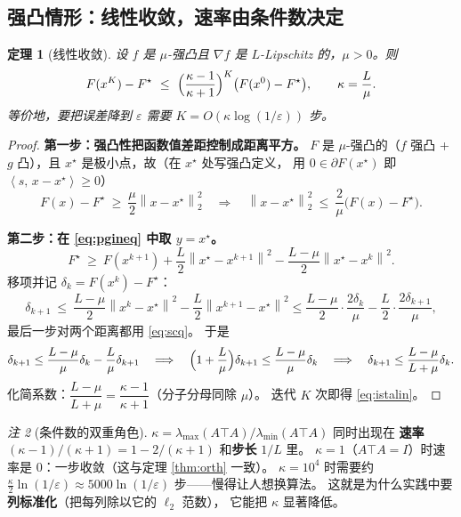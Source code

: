 \documentclass[11pt,a4paper,UTF8]{ctexart}
\theoremstyle{plain}
\newtheorem{theorem}{定理}[section]
\theoremstyle{definition}
\theoremstyle{remark}
\newtheorem{remark}[theorem]{注}
\newcommand{\norm}[1]{\left\lVert #1 \right\rVert}
\newcommand{\inner}[2]{\left\langle #1,\, #2 \right\rangle}
\newcommand{\eps}{\varepsilon}
\begin{document}
\subsection{强凸情形：线性收敛，速率由条件数决定}

\begin{theorem}[线性收敛]\label{thm:istalin}
设 $f$ 是 $\mu$-强凸且 $\nabla f$ 是 $L$-Lipschitz 的，$\mu>0$。则
\begin{equation}
F(x^K)-F^\star\ \le\ \Bigl(\frac{\kappa-1}{\kappa+1}\Bigr)^{K}\bigl(F(x^0)-F^\star\bigr),
\qquad \kappa=\frac L\mu .
\label{eq:istalin}
\end{equation}
等价地，要把误差降到 $\eps$ 需要 $K=O(\kappa\log(1/\eps))$ 步。
\end{theorem}

\begin{proof}
\textbf{第一步：强凸性把函数值差距控制成距离平方。}
$F$ 是 $\mu$-强凸的（$f$ 强凸 + $g$ 凸），且 $x^\star$ 是极小点，故（在 $x^\star$ 处写强凸定义，
用 $0\in\partial F(x^\star)$ 即 $\inner{s}{x-x^\star}\ge0$）
\begin{equation}
F(x)-F^\star\ \ge\ \frac\mu2\norm{x-x^\star}_2^2
\quad\Longrightarrow\quad
\norm{x-x^\star}_2^2\ \le\ \frac2\mu\bigl(F(x)-F^\star\bigr).
\label{eq:scq}
\end{equation}

\textbf{第二步：在 \eqref{eq:pgineq} 中取 $y=x^\star$。}
\[
F^\star\ \ge\ F(x^{k+1})+\frac L2\norm{x^\star-x^{k+1}}^2-\frac{L-\mu}{2}\norm{x^\star-x^k}^2 .
\]
移项并记 $\delta_k=F(x^k)-F^\star$：
\[
\delta_{k+1}\ \le\ \frac{L-\mu}{2}\norm{x^k-x^\star}^2-\frac L2\norm{x^{k+1}-x^\star}^2
\le\frac{L-\mu}{2}\cdot\frac{2\delta_k}{\mu}-\frac L2\cdot\frac{2\delta_{k+1}}{\mu},
\]
最后一步对两个距离都用 \eqref{eq:scq}。
于是
\[
\delta_{k+1}\le\frac{L-\mu}{\mu}\delta_k-\frac L\mu\delta_{k+1}
\quad\Longrightarrow\quad
\Bigl(1+\frac L\mu\Bigr)\delta_{k+1}\le\frac{L-\mu}{\mu}\delta_k
\quad\Longrightarrow\quad
\delta_{k+1}\le\frac{L-\mu}{L+\mu}\delta_k .
\]
化简系数：$\dfrac{L-\mu}{L+\mu}=\dfrac{\kappa-1}{\kappa+1}$（分子分母同除 $\mu$）。
迭代 $K$ 次即得 \eqref{eq:istalin}。
\end{proof}

\begin{remark}[条件数的双重角色]
$\kappa=\lambda_{\max}(A\top A)/\lambda_{\min}(A\top A)$ 同时出现在
\textbf{速率} $(\kappa-1)/(\kappa+1)=1-2/(\kappa+1)$ 和\textbf{步长} $1/L$ 里。
$\kappa=1$（$A\top A=I$）时速率是 $0$：一步收敛（这与定理 \ref{thm:orth} 一致）。
$\kappa=10^4$ 时需要约 $\frac{\kappa}{2}\ln(1/\eps)\approx5000\ln(1/\eps)$ 步——慢得让人想换算法。
这就是为什么实践中要\textbf{列标准化}（把每列除以它的 $\ell_2$ 范数），
它能把 $\kappa$ 显著降低。
\end{remark}
\end{document}
